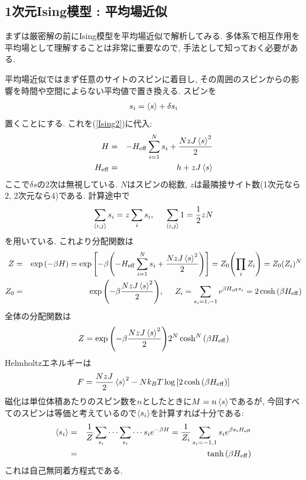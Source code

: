 \documentclass[10.5pt,a4paper]{jreport}
\begin{document}
\subsection{1次元Ising模型 : 平均場近似}
まずは厳密解の前にIsing模型を平均場近似で解析してみる. 多体系で相互作用を平均場として理解することは非常に重要なので, 手法として知っておく必要がある.

平均場近似ではまず任意のサイトのスピンに着目し, その周囲のスピンからの影響を時間や空間によらない平均値で置き換える. スピンを
\begin{eqnarray}
  s_i = \ev{s} + \delta s_i
\end{eqnarray}
置くことにする. これを(\ref{Ising2})に代入:
\begin{eqnarray}
  H &=& -H_{\rm{eff}}\sum_{i=1}^N s_i + \frac{NzJ\ev{s}^2}{2}\\
  H_{\rm{eff}} &=&  h + zJ\ev{s}
\end{eqnarray}
ここで$\delta s$の2次は無視している. $N$はスピンの総数, $z$は最隣接サイト数(1次元なら2, 2次元なら4)である. 計算途中で
\begin{eqnarray}
  \sum_{\ev{i, j}}s_i = z\sum_i s_i, \hspace{0.5cm}\sum_{\ev{i, j}}1 = \frac{1}{2}zN
\end{eqnarray}
を用いている. これより分配関数は
\begin{eqnarray}
  Z &=& \exp\qty(-\beta H) = \exp\qty[-\beta\qty(-H_{\rm{eff}}\sum_{i=1}^N s_i + \frac{NzJ\ev{s}^2}{2})] = Z_0\qty(\prod_iZ_i) = Z_0(Z_i)^N\\
  Z_0 &=& \exp\qty(-\beta\frac{NzJ\ev{s}^2}{2}), \hspace{0.5cm}Z_i = \sum_{s_i = 1, -1}e^{\beta H_{\rm{eff}}s_i} = 2\cosh\qty(\beta H_{\rm{eff}})
\end{eqnarray}
全体の分配関数は
\begin{eqnarray}
  Z = \exp\qty(-\beta\frac{NzJ\ev{s}^2}{2})2^N\cosh^N\qty(\beta H_{\rm eff})
\end{eqnarray}
Helmholtzエネルギーは
\begin{eqnarray}
  F = \frac{NzJ}{2}\ev{s}^2 - Nk_BT\log\qty[2\cosh\qty(\beta H_{\rm eff})]
\end{eqnarray}
磁化は単位体積あたりのスピン数を$n$としたときに$M=n\ev{s}$であるが, 今回すべてのスピンは等価と考えているので$\ev{s_i}$を計算すれば十分である:
\begin{eqnarray}
  \ev{s_i} &=& \frac{1}{Z}\sum_{s_i}\cdots\sum_{s_i}\cdots s_ie^{-\beta H} = \frac{1}{Z_i}\sum_{s_i = -1, 1}s_ie^{\beta s_iH_{\rm eff}}\\
  &=& \tanh\qty(\beta H_{\rm eff})
\end{eqnarray}
これは自己無同着方程式である.
\end{document}
